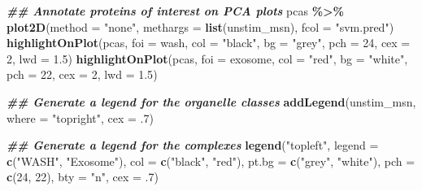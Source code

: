 \documentclass[9pt,a4paper,]{extarticle}
\newenvironment{Shaded}{\begin{snugshade}}{\end{snugshade}}
\newcommand{\AttributeTok}[1]{\textcolor[rgb]{0.13,0.29,0.53}{#1}}
\newcommand{\DecValTok}[1]{\textcolor[rgb]{0.00,0.00,0.81}{#1}}
\newcommand{\DocumentationTok}[1]{\textcolor[rgb]{0.56,0.35,0.01}{\textbf{\textit{#1}}}}
\newcommand{\FloatTok}[1]{\textcolor[rgb]{0.00,0.00,0.81}{#1}}
\newcommand{\FunctionTok}[1]{\textcolor[rgb]{0.13,0.29,0.53}{\textbf{#1}}}
\newcommand{\NormalTok}[1]{#1}
\newcommand{\SpecialCharTok}[1]{\textcolor[rgb]{0.81,0.36,0.00}{\textbf{#1}}}
\newcommand{\StringTok}[1]{\textcolor[rgb]{0.31,0.60,0.02}{#1}}
\begin{document}
\begin{Shaded}
\begin{Highlighting}[]
\DocumentationTok{\#\# Annotate proteins of interest on PCA plots}
\NormalTok{pcas }\SpecialCharTok{\%\textgreater{}\%} 
  \FunctionTok{plot2D}\NormalTok{(}\AttributeTok{method =} \StringTok{"none"}\NormalTok{, }\AttributeTok{methargs =} \FunctionTok{list}\NormalTok{(unstim\_msn), }\AttributeTok{fcol =} \StringTok{"svm.pred"}\NormalTok{) }
\FunctionTok{highlightOnPlot}\NormalTok{(pcas, }\AttributeTok{foi =}\NormalTok{ wash, }\AttributeTok{col =} \StringTok{"black"}\NormalTok{, }\AttributeTok{bg =} \StringTok{"grey"}\NormalTok{, }
                \AttributeTok{pch =} \DecValTok{24}\NormalTok{, }\AttributeTok{cex =} \DecValTok{2}\NormalTok{, }\AttributeTok{lwd =} \FloatTok{1.5}\NormalTok{) }
\FunctionTok{highlightOnPlot}\NormalTok{(pcas, }\AttributeTok{foi =}\NormalTok{ exosome, }\AttributeTok{col =} \StringTok{"red"}\NormalTok{, }\AttributeTok{bg =} \StringTok{"white"}\NormalTok{, }
                \AttributeTok{pch =} \DecValTok{22}\NormalTok{, }\AttributeTok{cex =} \DecValTok{2}\NormalTok{, }\AttributeTok{lwd =} \FloatTok{1.5}\NormalTok{)}

\DocumentationTok{\#\# Generate a legend for the organelle classes}
\FunctionTok{addLegend}\NormalTok{(unstim\_msn, }\AttributeTok{where =} \StringTok{"topright"}\NormalTok{, }\AttributeTok{cex =}\NormalTok{ .}\DecValTok{7}\NormalTok{)}

\DocumentationTok{\#\# Generate a legend for the complexes}
\FunctionTok{legend}\NormalTok{(}\StringTok{"topleft"}\NormalTok{, }\AttributeTok{legend =} \FunctionTok{c}\NormalTok{(}\StringTok{"WASH"}\NormalTok{, }\StringTok{"Exosome"}\NormalTok{), }
       \AttributeTok{col =} \FunctionTok{c}\NormalTok{(}\StringTok{"black"}\NormalTok{, }\StringTok{"red"}\NormalTok{), }
       \AttributeTok{pt.bg =} \FunctionTok{c}\NormalTok{(}\StringTok{"grey"}\NormalTok{, }\StringTok{"white"}\NormalTok{), }
       \AttributeTok{pch =} \FunctionTok{c}\NormalTok{(}\DecValTok{24}\NormalTok{, }\DecValTok{22}\NormalTok{), }\AttributeTok{bty =} \StringTok{"n"}\NormalTok{, }\AttributeTok{cex =}\NormalTok{ .}\DecValTok{7}\NormalTok{)}
\end{Highlighting}
\end{Shaded}
\end{document}

